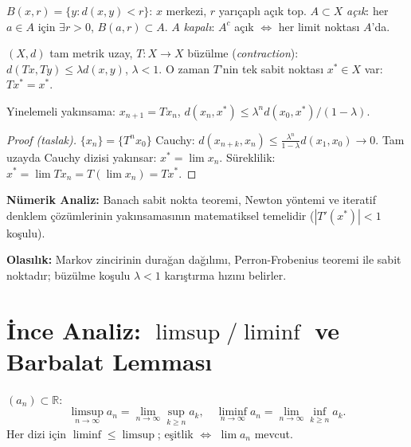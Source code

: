 \begin{tanim}\label{def:acik_kapali}
$B(x,r)=\{y:d(x,y)<r\}$: $x$ merkezi, $r$ yarıçaplı açık top.
$A\subset X$ \emph{açık}: her $a\in A$ için $\exists r>0$, $B(a,r)\subset A$.
$A$ \emph{kapalı}: $A^c$ açık $\iff$ her limit noktası $A$'da.
\end{tanim}

\begin{teorem}\label{thm:banach_sabit}
$(X,d)$ tam metrik uzay, $T:X\to X$ büzülme (\emph{contraction}): $d(Tx,Ty)\leq\lambda d(x,y)$, $\lambda<1$. O zaman $T$'nin tek sabit noktası $x^*\in X$ var: $Tx^*=x^*$.

Yinelemeli yakınsama: $x_{n+1}=Tx_n$, $d(x_n,x^*)\leq\lambda^n d(x_0,x^*)/(1-\lambda)$.
\end{teorem}

\begin{proof}[Proof (taslak)]
$\{x_n\}=\{T^nx_0\}$ Cauchy: $d(x_{n+k},x_n)\leq\frac{\lambda^n}{1-\lambda}d(x_1,x_0)\to0$. Tam uzayda Cauchy dizisi yakınsar: $x^*=\lim x_n$. Süreklilik: $x^*=\lim Tx_n=T(\lim x_n)=Tx^*$.
\end{proof}

\begin{disiplinlerarasibaglan}
\textbf{Nümerik Analiz:} Banach sabit nokta teoremi, Newton yöntemi ve iteratif denklem çözümlerinin yakınsamasının matematiksel temelidir ($|T'(x^*)|<1$ koşulu).

\textbf{Olasılık:} Markov zincirinin durağan dağılımı, Perron-Frobenius teoremi ile sabit noktadır; büzülme koşulu $\lambda<1$ karıştırma hızını belirler.
\end{disiplinlerarasibaglan}

\section{İnce Analiz: $\limsup/\liminf$ ve Barbalat Lemması}
\label{sec:ince_analiz}

\begin{tanim}\label{def:limsup_sayi}
$(a_n)\subset\mathbb{R}$:
\[
  \limsup_{n\to\infty}a_n = \lim_{n\to\infty}\sup_{k\geq n}a_k,\quad
  \liminf_{n\to\infty}a_n = \lim_{n\to\infty}\inf_{k\geq n}a_k.
\]
Her dizi için $\liminf\leq\limsup$; eşitlik $\iff$ $\lim a_n$ mevcut.
\end{tanim}

